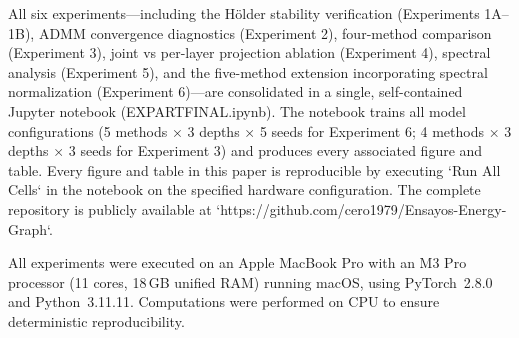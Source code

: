 \documentclass[a4paper,fleqn]{cas-sc}
\theoremstyle{remark}
\theoremstyle{definition}
\begin{document}
All six experiments—including the Hölder stability verification (Experiments 1A–1B), ADMM convergence diagnostics (Experiment 2), four-method comparison (Experiment 3), joint vs per-layer projection ablation (Experiment 4), spectral analysis (Experiment 5), and the five-method extension incorporating spectral normalization (Experiment 6)—are consolidated in a single, self-contained Jupyter notebook (EXPARTFINAL.ipynb). The notebook trains all model configurations (5 methods × 3 depths × 5 seeds for Experiment 6; 4 methods × 3 depths × 3 seeds for Experiment 3) and produces every associated figure and table. Every figure and table in this paper is reproducible by executing `Run All Cells` in the notebook on the specified hardware configuration. The complete repository is publicly available at `https://github.com/cero1979/Ensayos-Energy-Graph`.

All experiments were executed on an Apple MacBook Pro with an M3 Pro processor (11 cores, 18\,GB unified RAM) running macOS, using PyTorch~2.8.0 and Python~3.11.11. Computations were performed on CPU to ensure deterministic reproducibility.


\end{document}
